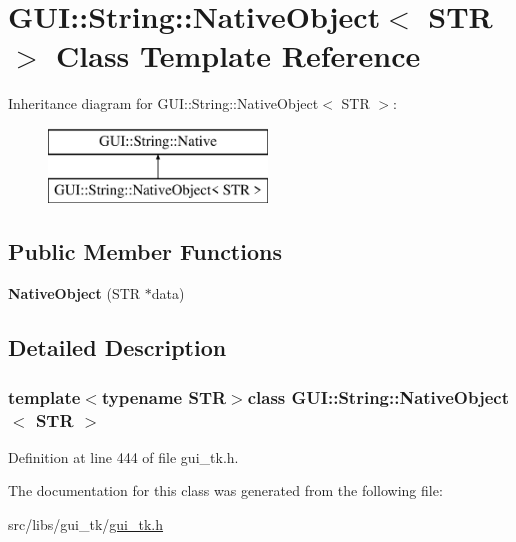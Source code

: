 \hypertarget{classGUI_1_1String_1_1NativeObject}{\section{G\-U\-I\-:\-:String\-:\-:Native\-Object$<$ S\-T\-R $>$ Class Template Reference}
\label{classGUI_1_1String_1_1NativeObject}
}
Inheritance diagram for G\-U\-I\-:\-:String\-:\-:Native\-Object$<$ S\-T\-R $>$\-:\begin{figure}[H]
\begin{center}
\leavevmode
\includegraphics[height=2.000000cm]{classGUI_1_1String_1_1NativeObject}
\end{center}
\end{figure}
\subsection*{Public Member Functions}
\begin{DoxyCompactItemize}
\item 
\hypertarget{classGUI_1_1String_1_1NativeObject_ae2603760ef4c500fc55113eb75faae22}{{\bfseries Native\-Object} (S\-T\-R $\ast$data)}\label{classGUI_1_1String_1_1NativeObject_ae2603760ef4c500fc55113eb75faae22}

\end{DoxyCompactItemize}


\subsection{Detailed Description}
\subsubsection*{template$<$typename S\-T\-R$>$class G\-U\-I\-::\-String\-::\-Native\-Object$<$ S\-T\-R $>$}



Definition at line 444 of file gui\-\_\-tk.\-h.



The documentation for this class was generated from the following file\-:\begin{DoxyCompactItemize}
\item 
src/libs/gui\-\_\-tk/\hyperlink{gui__tk_8h}{gui\-\_\-tk.\-h}\end{DoxyCompactItemize}

